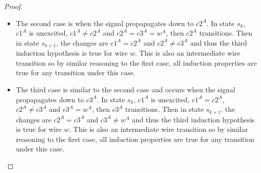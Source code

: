 \documentclass[12pt]{report}
\begin{document}
\begin{proof}
\begin{itemize}
\item The second case is when the signal propapagates down to $c2^A$.  In state $s_k$, $c1^A$ is unexcited, $c1^{A}\neq c2^{A}$ and $c2^A=c3^A=w^A$, then $c2^A$ transitions.  
Then in state $s_{k+1}$, the changes are $c1^A=c2^A$ and $c2^{A}\neq c3^{A}$ and thus the third induction hypothesis is true for wire $w$.  This is also an intermediate wire transition so by similar reasoning to the first case, all induction properties are true for any transition under this case.   
\item The third case is similar to the second case and occurs when the signal propapagates down to $c3^A$.  In state $s_k$, $c1^A$ is unexcited, $c1^A=c2^A$, $c2^{A}\neq c3^{A}$ and $c3^A=w^A$, then $c3^A$ transitions.  
Then in state $s_{k+1}$, the changes are $c2^A=c3^A$ and $c3^{A}\neq w^{A}$ and thus the third induction hypothesis is true for wire $w$.  This is also an intermediate wire transition so by similar reasoning to the first case, all induction properties are true for any transition under this case.   


\end{itemize}
\end{proof}
\end{document}
